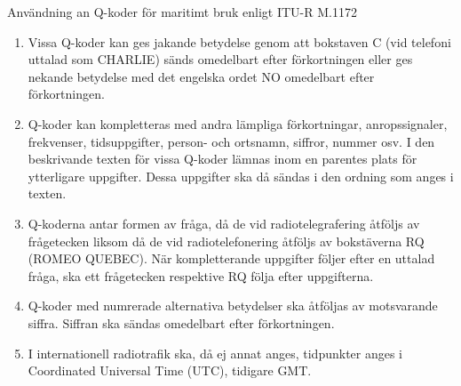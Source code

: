 Användning an Q-koder för maritimt bruk enligt ITU-R M.1172
\begin{enumerate}
	\item Vissa Q-koder kan ges jakande betydelse genom att bokstaven C
	(vid telefoni uttalad som CHARLIE) sänds omedelbart efter
	förkortningen eller ges nekande betydelse med det engelska ordet NO
	omedelbart efter förkortningen.
	\item Q-koder kan kompletteras med andra lämpliga förkortningar,
	anropssignaler, frekvenser, tidsuppgifter, person- och ortsnamn,
	siffror, nummer osv. I den beskrivande texten för vissa Q-koder
	lämnas inom en parentes plats för ytterligare uppgifter. Dessa
	uppgifter ska då sändas i den ordning som anges i texten.
	\item Q-koderna antar formen av fråga, då de vid radiotelegrafering
	åtföljs av frågetecken liksom då de vid radiotelefonering åtföljs av
	bokstäverna RQ (ROMEO QUEBEC). När kompletterande uppgifter följer
	efter en uttalad fråga, ska ett frågetecken respektive RQ följa
	efter uppgifterna.
	\item Q-koder med numrerade alternativa betydelser ska åtföljas av
	motsvarande siffra. Siffran ska sändas omedelbart efter
	förkortningen.
	\item I internationell radiotrafik ska, då ej annat anges,
	tidpunkter anges i Coordinated Universal Time (UTC), tidigare GMT.
\end{enumerate}
